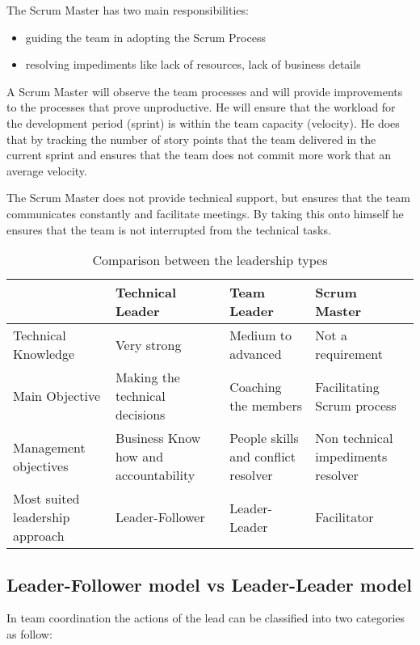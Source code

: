 The Scrum Master has two main responsibilities:

\begin{itemize}
\item guiding the team in adopting the Scrum Process
\item resolving impediments like lack of resources, lack of business details
\end{itemize}

A Scrum Master will observe the team processes and will provide improvements to the processes that prove unproductive. He will ensure that the workload for the development period (sprint) is within the team capacity (velocity). He does that by tracking the number of story points that the team delivered in the current sprint and ensures that the team does not commit more work that an average velocity.

The Scrum Master does not provide technical support, but ensures that the team communicates constantly and facilitate meetings. By taking this onto himself he ensures that the team is not interrupted from the technical tasks.
\begin{table}
	\begin{center}
	\begin{tabular}{| p{4cm} | p{4cm} | p{4cm} | p{4cm}|}
		\hline
		 & Technical Leader & Team Leader & Scrum Master \\ \hline
	    Technical Knowledge & Very strong & Medium to advanced & Not a requirement \\ \hline
	    Main Objective & Making the technical decisions & Coaching the members & Facilitating Scrum process \\ \hline
    	Management objectives & Business Know how and accountability & People skills and conflict resolver & Non technical impediments resolver \\ \hline
	    Most suited leadership approach & Leader-Follower & Leader-Leader & Facilitator \\ 
\hline

		\end{tabular}
		\caption{Comparison between the leadership types}
		\label{tab:leader-comp}
	\end{center}
\end{table}
\subsection{Leader-Follower model vs Leader-Leader model}

In team coordination the actions of the lead can be classified into two categories as follow:

